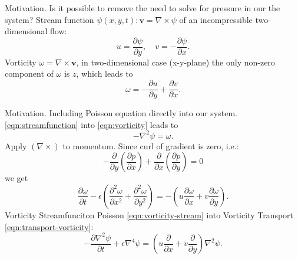 \documentclass{beamer}
\begin{document}
	\begin{frame}{Motivation. Is it possible to remove the need to solve for pressure in our the system?}
	Stream function $\psi(x,y,t):\boldsymbol{v}=\nabla \times \psi$ of an incompressible two-dimensional flow:
	\begin{equation}
	\label{eqn:streamfunction}
		u = \frac{\partial \psi}{\partial y},\quad v=-\frac{\partial \psi}{\partial x}.
	\end{equation}
	Vorticity $\omega = \nabla \times \boldsymbol{v}$, in two-dimensional case (x-y-plane) the only non-zero component of $\omega$ is $z$, which leads to
	\begin{equation}
	\label{eqn:vorticity}
		\omega=- \frac{\partial u}{\partial y}+\frac{\partial v}{\partial x}.
	\end{equation}
	\end{frame}
  
  \begin{frame}{Motivation. Including Poisson equation directly into our system.}
  \eqref{eqn:streamfunction} into \eqref{eqn:vorticity} leads to
	\begin{equation}
			\label{eqn:vorticity-stream}
			-\nabla ^2 \psi = \omega.
		\end{equation}
  Apply $(\nabla \times)$ to momentum. Since curl of gradient is zero, i.e.:
	\begin{equation}
	-\frac{\partial}{\partial y}\left(\frac{\partial p}{\partial x}\right)  
	+\frac{\partial}{\partial x}\left(\frac{\partial p}{\partial y}\right)=0
	\end{equation}
	we get
  \begin{equation}
			\label{eqn:transport-vorticity}
				\frac{\partial\omega}{\partial t} -\epsilon \left(\frac{\partial ^2 \omega}{\partial x^2} 
				+ \frac{\partial^2 \omega}{\partial y^2} \right)
				=-\left( u \frac{\partial\omega}{\partial x} 
				+ v\frac{\partial\omega}{\partial y}\right).
			\end{equation}
	Vorticity Streamfunciton Poisson \eqref{eqn:vorticity-stream} into Vorticity Transport \eqref{eqn:transport-vorticity}:
	\begin{equation}
	\label{eqn:biharmonic-streamfunction}
		\boxed{
		-\frac{\partial\nabla ^2 \psi}{\partial t} 
		+\epsilon\nabla ^4 \psi=\left( u \frac{\partial}{\partial x} 
				+ v\frac{\partial}{\partial y}\right)\nabla^2\psi.
		}
	\end{equation}
	\end{frame}
	
\end{document}

